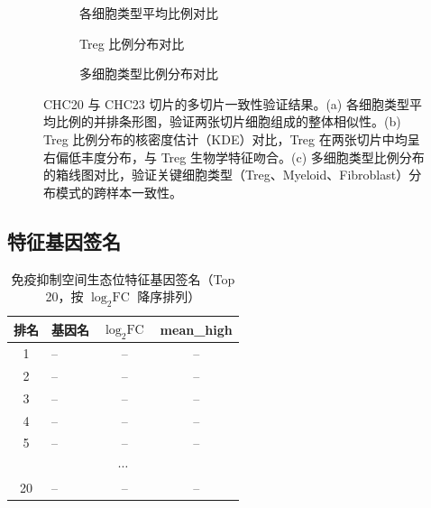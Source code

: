 \documentclass[12pt, a4paper]{ctexart}
\begin{document}
\begin{figure}[H]
\centering
\begin{subfigure}[b]{0.48\textwidth}
\caption{各细胞类型平均比例对比}
\end{subfigure}
\hfill
\begin{subfigure}[b]{0.48\textwidth}
\caption{Treg 比例分布对比}
\end{subfigure}

\vspace{0.5cm}

\begin{subfigure}[b]{0.75\textwidth}
\caption{多细胞类型比例分布对比}
\end{subfigure}
\caption{CHC20 与 CHC23 切片的多切片一致性验证结果。(a) 各细胞类型平均比例的并排条形图，验证两张切片细胞组成的整体相似性。(b) Treg 比例分布的核密度估计（KDE）对比，Treg 在两张切片中均呈右偏低丰度分布，与 Treg 生物学特征吻合。(c) 多细胞类型比例分布的箱线图对比，验证关键细胞类型（Treg、Myeloid、Fibroblast）分布模式的跨样本一致性。}
\label{fig:cross_slice}
\end{figure}

\subsection{特征基因签名}

\begin{table}[H]
\centering
\caption{免疫抑制空间生态位特征基因签名（Top 20，按 $\log_2\text{FC}$ 降序排列）}
\label{tab:signature_genes}
\begin{tabular}{clcc}
\toprule
\textbf{排名} & \textbf{基因名} & \textbf{$\log_2\text{FC}$} & \textbf{mean\_high} \\
\midrule
1 & -- & -- & -- \\
2 & -- & -- & -- \\
3 & -- & -- & -- \\
4 & -- & -- & -- \\
5 & -- & -- & -- \\
\multicolumn{4}{c}{$\cdots$} \\
20 & -- & -- & -- \\
\bottomrule
\end{tabular}
\end{table}
\end{document}
